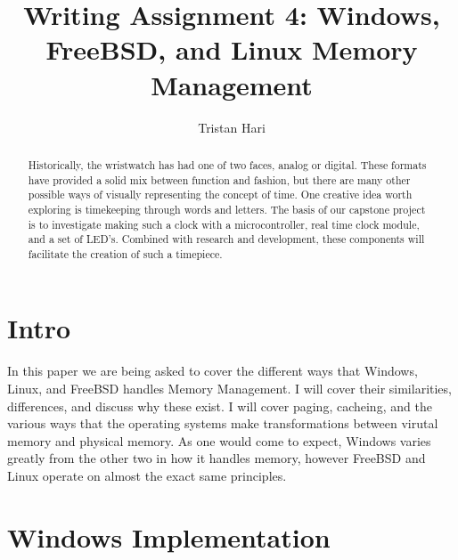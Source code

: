 \documentclass[10pt,draftclsnofoot,onecolumn]{IEEEtran}
\begin{document}
\title{Writing Assignment 4: Windows, FreeBSD, and Linux Memory Management}
\author{Tristan Hari}
\maketitle
\begin{abstract}
Historically, the wristwatch has had one of two faces, analog or digital. These
formats have provided a solid mix between function and fashion, but there are
many other possible ways of visually representing the concept of time. One
creative idea worth exploring is timekeeping through words and letters. The
basis of our capstone project is to investigate making such a clock with a
microcontroller, real time clock module, and a set of LED’s. Combined with
research and development, these components will facilitate the creation of such
a timepiece. 
\end{abstract}
\IEEEpeerreviewmaketitle

\newpage
{}

\section{Intro}
In this paper we are being asked to cover the different ways that Windows, Linux,
and FreeBSD handles Memory Management. I will cover their similarities,
differences, and discuss why these exist. I will cover paging, cacheing, and the
various ways that the operating systems make transformations between virutal
memory and physical memory. As one would come to expect, Windows varies greatly
from the other two in how it handles memory, however FreeBSD and Linux operate
on almost the exact same principles.

\newpage


\section{Windows Implementation}
\end{document}
